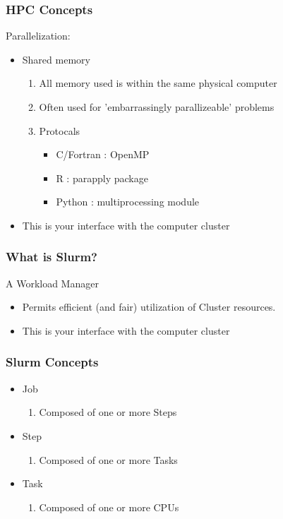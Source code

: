 \documentclass{beamer}
\begin{document}
\begin{frame}
\frametitle{HPC Concepts}
Parallelization:
\begin{itemize}
    \item Shared memory
        \begin{enumerate}
            \item All memory used is within the same physical computer
            \pause
            \item Often used for 'embarrassingly parallizeable' problems
            \pause 
            \item Protocals 
                \begin{itemize}
                    \item C/Fortran : OpenMP
                    \item R : parapply package
                    \item Python : multiprocessing module
                \end{itemize}
        \end{enumerate}
    
    \pause
    \bigskip
    \item This is your interface with the computer cluster
\end{itemize}
\end{frame}
 



\begin{frame}
\frametitle{What is Slurm?}
A Workload Manager
\begin{itemize}
    \item Permits efficient (and fair) utilization of Cluster resources.
    \bigskip
    \item This is your interface with the computer cluster
\end{itemize}
\end{frame}
 

\begin{frame}
\frametitle{Slurm Concepts}
\begin{itemize}
    \item Job
    \pause 
    \begin{enumerate}
        \item Composed of one or more Steps
    \end{enumerate}
    \bigskip
    \pause
    \item Step
    \begin{enumerate}
        \item Composed of one or more Tasks
    \end{enumerate}
    \bigskip
    \pause
    \item Task
    \begin{enumerate}
        \item Composed of one or more CPUs
    \end{enumerate}
    \bigskip
\end{itemize}
\end{frame}
\end{document}
